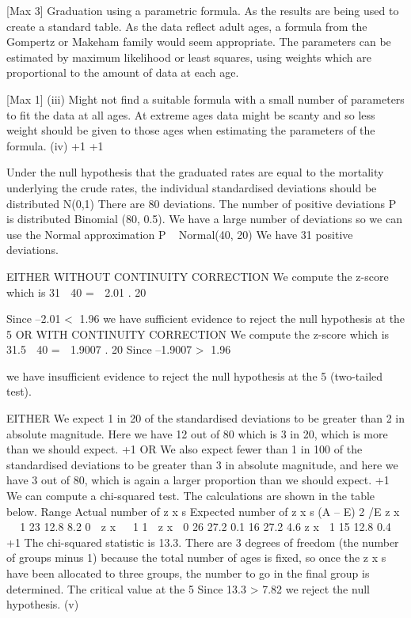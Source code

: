 \documentclass[a4paper,12pt]{article}
\begin{document}
[Max 3]
Graduation using a parametric formula. 
As the results are being used to create a standard table. 
As the data reflect adult ages, a formula from the Gompertz or Makeham family would seem appropriate. 
The parameters can be estimated by maximum likelihood or least squares, using weights which are proportional to the amount of data at each age.

[Max 1]
(iii)
Might not find a suitable formula with a small number of parameters to fit the data at all ages.
At extreme ages data might be scanty and so less weight should be given to those ages when estimating the parameters of the formula.
(iv)
+1
+1

Under the null hypothesis that the graduated rates are equal to the mortality underlying the crude rates, 
the individual standardised deviations should be distributed N(0,1) 
There are 80 deviations. 
The number of positive deviations P is distributed Binomial (80, 0.5). 
We have a large number of deviations so
we can use the Normal approximation 
P ~ Normal(40, 20)
We have 31 positive deviations.

EITHER WITHOUT CONTINUITY CORRECTION
We compute the z-score which is
31  40
\;=\;  2.01 .
20

Since –2.01 < 1.96 
we have sufficient evidence to reject the null hypothesis at the
5%
OR WITH CONTINUITY CORRECTION
We compute the z-score which is
31.5  40
\;=\;  1.9007 .
20
Since –1.9007 > 1.96


we have insufficient evidence to reject the null hypothesis at the 5%
(two-tailed test).

EITHER
We expect 1 in 20 of the standardised deviations to be greater than 2 in absolute magnitude. Here we have 12 out of 80 which is 3 in 20, which is more than we should expect.
+1
OR
We also expect fewer than 1 in 100 of the standardised deviations to be greater than 3 in absolute magnitude, and here
we have 3 out of 80, which is again a larger proportion than we should expect.
+1
We can compute a chi-squared test. The calculations are shown in the table below.
Range Actual number
of z x s Expected number
of z x s (A – E) 2 /E
z x   1 23 12.8 8.2
0  z x   1
1  z x  0 26 27.2 0.1
16 27.2 4.6
z x  1 15 12.8 0.4
+1
The chi-squared statistic is 13.3. 
There are 3 degrees of freedom (the number of groups minus 1) 
because the total number of ages is fixed, so once the z x s have been allocated to three groups, the number to go in the final group is determined. 
The critical value at the 5%
Since 13.3 > 7.82 we reject the null hypothesis.
(v)
\end{document}
